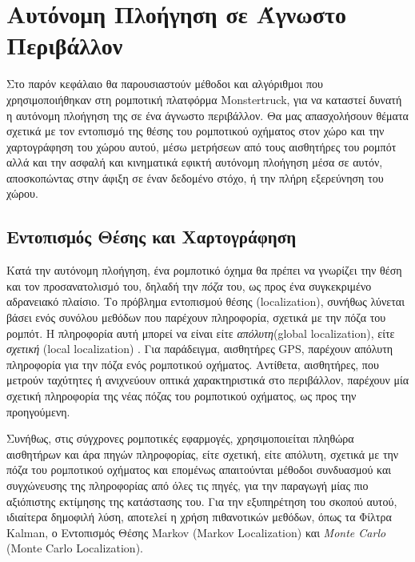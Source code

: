 
\chapter{Αυτόνομη Πλοήγηση σε Άγνωστο Περιβάλλον} %
\label{Chapter3} %

Στο παρόν κεφάλαιο θα παρουσιαστούν μέθοδοι και αλγόριθμοι που χρησιμοποιήθηκαν στη ρομποτική πλατφόρμα Monstertruck, για να καταστεί δυνατή η αυτόνομη πλοήγηση της σε ένα άγνωστο περιβάλλον. Θα μας απασχολήσουν θέματα σχετικά με τον εντοπισμό της θέσης του ρομποτικού οχήματος στον χώρο και την χαρτογράφηση του χώρου αυτού, μέσω μετρήσεων από τους αισθητήρες του ρομπότ αλλά και την ασφαλή και κινηματικά εφικτή αυτόνομη πλοήγηση μέσα σε αυτόν, αποσκοπώντας στην άφιξη σε έναν δεδομένο στόχο, ή την πλήρη εξερεύνηση του χώρου.

\section{Εντοπισμός Θέσης και Χαρτογράφηση} \label{sec:localization_and_mapping}
Κατά την αυτόνομη πλοήγηση, ένα ρομποτικό όχημα θα πρέπει να γνωρίζει την θέση και τον προσανατολισμό του, δηλαδή την \textit{πόζα} του, ως προς ένα συγκεκριμένο αδρανειακό πλαίσιο. Το πρόβλημα εντοπισμού θέσης (localization), συνήθως λύνεται βάσει ενός συνόλου μεθόδων που παρέχουν πληροφορία, σχετικά με την πόζα του ρομπότ. Η πληροφορία αυτή μπορεί να είναι είτε \textit{απόλυτη}(global localization), είτε \textit{σχετική} (local localization) \cite{autonomous_land_vehicles}. Για παράδειγμα, αισθητήρες GPS, παρέχουν απόλυτη πληροφορία για την πόζα ενός ρομποτικού οχήματος. Αντίθετα, αισθητήρες, που μετρούν ταχύτητες ή ανιχνεύουν οπτικά χαρακτηριστικά στο περιβάλλον, παρέχουν μία σχετική πληροφορία της νέας πόζας του ρομποτικού οχήματος, ως προς την προηγούμενη.

\bigskip
Συνήθως, στις σύγχρονες ρομποτικές εφαρμογές, χρησιμοποιείται πληθώρα αισθητήρων και άρα πηγών πληροφορίας, είτε σχετική, είτε απόλυτη, σχετικά με την πόζα του ρομποτικού οχήματος και επομένως απαιτούνται μέθοδοι συνδυασμού και συγχώνευσης της πληροφορίας από όλες τις πηγές, για την παραγωγή μίας πιο αξιόπιστης εκτίμησης της κατάστασης του. Για την εξυπηρέτηση του σκοπού αυτού, ιδιαίτερα δημοφιλή λύση, αποτελεί η χρήση πιθανοτικών μεθόδων, όπως τα {Φίλτρα Kalman}, ο {Εντοπισμός Θέσης Markov} ({Markov Localization}) και \textit{Monte Carlo} ({Monte Carlo Localization}).


